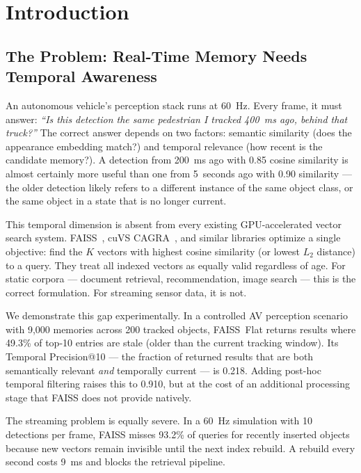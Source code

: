 \documentclass[11pt]{article}
\begin{document}
\section{Introduction}
\label{sec:intro}

\subsection{The Problem: Real-Time Memory Needs Temporal Awareness}

An autonomous vehicle's perception stack runs at 60~Hz. Every frame, it
must answer: \emph{``Is this detection the same pedestrian I tracked
400~ms ago, behind that truck?''} The correct answer depends on two
factors: semantic similarity (does the appearance embedding match?) and
temporal relevance (how recent is the candidate memory?). A detection
from 200~ms ago with 0.85 cosine similarity is almost certainly more
useful than one from 5~seconds ago with 0.90 similarity --- the older
detection likely refers to a different instance of the same object
class, or the same object in a state that is no longer current.

This temporal dimension is absent from every existing GPU-accelerated
vector search system. FAISS~\cite{faiss}, cuVS CAGRA~\cite{cuvs}, and
similar libraries optimize a single objective: find the $K$ vectors with
highest cosine similarity (or lowest $L_2$ distance) to a query. They
treat all indexed vectors as equally valid regardless of age. For static
corpora --- document retrieval, recommendation, image search --- this is
the correct formulation. For streaming sensor data, it is not.

We demonstrate this gap experimentally. In a controlled AV perception
scenario with 9{,}000 memories across 200 tracked objects, FAISS~Flat
returns results where 49.3\% of top-10 entries are stale (older than the
current tracking window). Its Temporal Precision@10 --- the fraction of
returned results that are both semantically relevant \emph{and}
temporally current --- is 0.218. Adding post-hoc temporal filtering
raises this to 0.910, but at the cost of an additional processing stage
that FAISS does not provide natively.

The streaming problem is equally severe. In a 60~Hz simulation with 10
detections per frame, FAISS misses 93.2\% of queries for recently
inserted objects because new vectors remain invisible until the next
index rebuild. A rebuild every second costs 9~ms and blocks the
retrieval pipeline.
\end{document}
